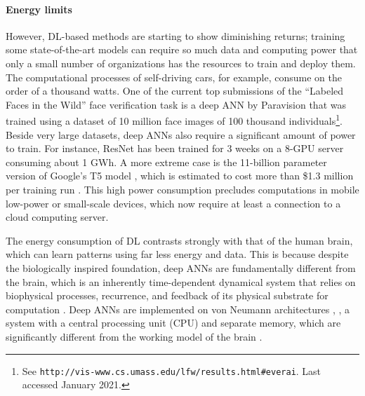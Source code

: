 \paragraph{Energy limits}
However, DL-based methods are starting to show diminishing returns; training some state-of-the-art models can require so much data and computing power that only a small number of organizations has the resources to train and deploy them.
The computational processes of self-driving cars, for example, consume on the order of a thousand watts.
One of the current top submissions of the ``Labeled Faces in the Wild'' face verification task is a deep ANN by Paravision that was trained using a dataset of 10 million face images of 100 thousand individuals\footnote{See \texttt{http://vis-www.cs.umass.edu/lfw/results.html\#everai}. Last accessed January 2021.}.
Beside very large datasets, deep ANNs also require a significant amount of power to train.
For instance, ResNet \citep{he2016deep} has been trained for 3 weeks on a 8-GPU server consuming about 1 GWh.
A more extreme case is the 11-billion parameter version of Google's T5 model \citep{raffel2019exploring}, which is estimated to cost more than \$1.3 million per training run \citep{sharir2020cost}.
This high power consumption precludes computations in mobile low-power or small-scale devices, which now require at least a connection to a cloud computing server.

The energy consumption of DL contrasts strongly with that of the human brain, which can learn patterns using far less energy and data.
This is because despite the biologically inspired foundation, deep ANNs are fundamentally different from the brain, which is an inherently time-dependent dynamical system \citep{sacramento2018dendritic, wozniak2020deep} that relies on biophysical processes, recurrence, and feedback of its physical substrate for computation \citep{sterling2015principles,bhalla2014molecular}.
Deep ANNs are implemented on von Neumann architectures \citep{von1993first}, \ie, a system with a central processing unit (CPU) and separate memory, which are significantly different from the working model of the brain \citep{schuman2017survey}.

